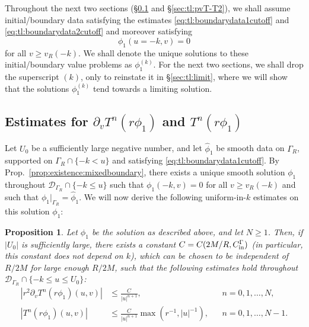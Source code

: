 \documentclass[11pt,english]{article}
\numberwithin{equation}{section}
\theoremstyle{remark}
\theoremstyle{plain}
\newtheorem{prop}{Proposition}[section]
\theoremstyle{remark}
\newcommand{\pv}{\partial_v}
\renewcommand{\(}{\left(}
\renewcommand{\)}{\right)}
\begin{document}
Throughout the next two sections (\S \ref{sec:tl:pvT} and \S \ref{sec:tl:pvT-T2}), we shall assume initial/boundary data satisfying the estimates \eqref{eq:tl:boundarydata1cutoff} and \eqref{eq:tl:boundarydata2cutoff} and moreover satisfying
\begin{equation}\label{eq:tl:noincomingfinite}
\phi_1(u=-k,v)=0
\end{equation}
for all $v\geq v_R(-k)$. We shall denote the unique solutions to these initial/boundary value problems as $\phi_1^{(k)}$.
For the next two sections, we shall drop the superscript $(k)$, only to reinstate it in \S\ref{sec:tl:limit}, where we will show that the solutions $\phi_1^{(k)}$ tend towards a limiting solution.
\subsection{Estimates for \texorpdfstring{$\pv T^n (r\phi_1)$}{d/dv(Tn(r phi1))} and \texorpdfstring{$T^n(r\phi_1)$}{Tn(r phi1)}}\label{sec:tl:pvT}
Let $U_0$ be a sufficiently large negative number, and let $\hat{\phi}_1$ be smooth data on $\Gamma_R$, supported on $\Gamma_R\cap\{-k< u\}$ and satisfying \eqref{eq:tl:boundarydata1cutoff}. 
By Prop.~\ref{prop:existence:mixedboundary}, there exists a unique smooth solution $\phi_1$ throughout $\mathcal{D}_{\Gamma_R}\cap\{-k\leq u\}$  such that $\phi_1(-k,v)=0$ for all $v\geq v_R(-k)$ and such that $\phi_1|_{\Gamma_R}=\hat{\phi}_1$. 
We will now derive the following uniform-in-$k$ estimates on this solution $\phi_1$:
\begin{prop}\label{prop:tl:pv}
Let $\phi_1$ be the solution as described above, and let $N\geq 1$. Then, if  $|U_0|$ is sufficiently large, there exists a constant $C=C(2M/R,C_{\mathrm{in}}^\Gamma)$ (in particular, this constant does not depend on $k$), which can be chosen to be independent of $R/2M$ for large enough $R/2M$,  such that the following estimates hold throughout $\mathcal{D}_{\Gamma_R}\cap\{-k\leq u\leq U_0\}$:
\begin{align}
\left|r^2\pv T^n (r\phi_1)(u,v)\right|&\leq \frac{C}{|u|^{n+1}},&&n=0,1,\dots,N,\\
\left|T^n (r\phi_1)(u,v)\right|&\leq \frac{C}{|u|^{n+1}}\max\left(r^{-1},|u|^{-1}\right),&&n=0,1,\dots,N-1.
\end{align}
\end{prop}
\end{document}
